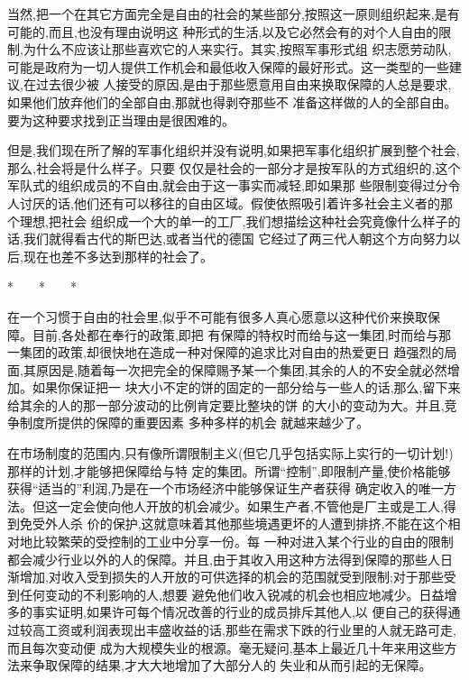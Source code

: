 ﻿\documentclass[12pt]{article}
\begin{document}
当然,把一个在其它方面完全是自由的社会的某些部分,按照这一原则组织起来,是有可能的,而且,也没有理由说明这
种形式的生活,以及它必然会有的对个人自由的限制,为什么不应该让那些喜欢它的人来实行。其实,按照军事形式组
织志愿劳动队,可能是政府为一切人提供工作机会和最低收入保障的最好形式。这一类型的一些建议,在过去很少被
人接受的原因,是由于那些愿意用自由来换取保障的人总是要求,如果他们放弃他们的全部自由,那就也得剥夺那些不
准备这样做的人的全部自由。要为这种要求找到正当理由是很困难的。

但是,我们现在所了解的军事化组织并没有说明,如果把军事化组织扩展到整个社会,那么,社会将是什么样子。只要
仅仅是社会的一部分才是按军队的方式组织的,这个军队式的组织成员的不自由,就会由于这一事实而减轻,即如果那
些限制变得过分令人讨厌的话,他们还有可以移往的自由区域。假使依照吸引着许多社会主义者的那个理想,把社会
组织成一个大的单一的工厂,我们想描绘这种社会究竟像什么样子的话,我们就得看古代的斯巴达,或者当代的德国
\myrule 它经过了两三代人朝这个方向努力以后,现在也差不多达到那样的社会了。

*　　*　　*

在一个习惯于自由的社会里,似乎不可能有很多人真心愿意以这种代价来换取保障。目前,各处都在奉行的政策,即把
有保障的特权时而给与这一集团,时而给与那一集团的政策,却很快地在造成一种对保障的追求比对自由的热爱更日
趋强烈的局面,其原因是,随着每一次把完全的保障赐予某一个集团,其余的人的不安全就必然增加。如果你保证把一
块大小不定的饼的固定的一部分给与一些人的话,那么,留下来给其余的人的那一部分波动的比例肯定要比整块的饼
的大小的变动为大。并且,竞争制度所提供的保障的重要因素 \myrule 多种多样的机会 \myrule 就越来越少了。

在市场制度的范围内,只有像所谓限制主义(但它几乎包括实际上实行的一切计划!)那样的计划,才能够把保障给与特
定的集团。所谓``控制'',即限制产量,使价格能够获得``适当的''利润,乃是在一个市场经济中能够保证生产者获得
确定收入的唯一方法。但这一定会使向他人开放的机会减少。如果生产者,不管他是厂主或是工人,得到免受外人杀
价的保护,这就意味着其他那些境遇更坏的人遭到排挤,不能在这个相对地比较繁荣的受控制的工业中分享一份。每
一种对进入某个行业的自由的限制都会减少行业以外的人的保障。并且,由于其收入用这种方法得到保障的那些人日
渐增加,对收入受到损失的人开放的可供选择的机会的范围就受到限制;对于那些受到任何变动的不利影响的人,想要
避免他们收入锐减的机会也相应地减少。日益增多的事实证明,如果许可每个情况改善的行业的成员排斥其他人,以
便自己的获得通过较高工资或利润表现出丰盛收益的话,那些在需求下跌的行业里的人就无路可走,而且每次变动便
成为大规模失业的根源。毫无疑问,基本上最近几十年来用这些方法来争取保障的结果,才大大地增加了大部分人的
失业和从而引起的无保障。
\end{document}
